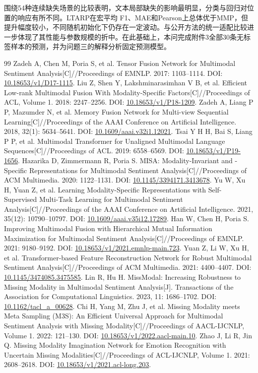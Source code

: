 \documentclass[UTF8,a4paper,11pt]{ctexart}
\newcommand{\QTwoParagraph}{\par\noindent\hspace*{2em}}
\newcounter{q2algorithm}
\begin{document}
\QTwoParagraph 围绕54种连续缺失场景的比较表明，文本局部缺失的影响最明显，分类与回归对位置的响应有所不同。LTARP在宏平均 F1、MAE和Pearson上总体优于MMP，但提升幅度较小，不同随机初始化下仍存在一定波动。与公开方法的统一适配比较进一步体现了其性能与参数规模的折中。在此基础上，本问完成附件3全部30条无标签样本的预测，并为问题三的解释分析固定预测模型。

\clearpage
{\small
\begin{thebibliography}{99}
 Zadeh A, Chen M, Poria S, et al. Tensor Fusion Network for Multimodal Sentiment Analysis[C]//Proceedings of EMNLP. 2017: 1103--1114. DOI: \url{10.18653/v1/D17-1115}.
 Liu Z, Shen Y, Lakshminarasimhan V B, et al. Efficient Low-rank Multimodal Fusion With Modality-Specific Factors[C]//Proceedings of ACL, Volume 1. 2018: 2247--2256. DOI: \url{10.18653/v1/P18-1209}.
 Zadeh A, Liang P P, Mazumder N, et al. Memory Fusion Network for Multi-view Sequential Learning[C]//Proceedings of the AAAI Conference on Artificial Intelligence. 2018, 32(1): 5634--5641. DOI: \url{10.1609/aaai.v32i1.12021}.
 Tsai Y H H, Bai S, Liang P P, et al. Multimodal Transformer for Unaligned Multimodal Language Sequences[C]//Proceedings of ACL. 2019: 6558--6569. DOI: \url{10.18653/v1/P19-1656}.
 Hazarika D, Zimmermann R, Poria S. MISA: Modality-Invariant and -Specific Representations for Multimodal Sentiment Analysis[C]//Proceedings of ACM Multimedia. 2020: 1122--1131. DOI: \url{10.1145/3394171.3413678}.
 Yu W, Xu H, Yuan Z, et al. Learning Modality-Specific Representations with Self-Supervised Multi-Task Learning for Multimodal Sentiment Analysis[C]//Proceedings of the AAAI Conference on Artificial Intelligence. 2021, 35(12): 10790--10797. DOI: \url{10.1609/aaai.v35i12.17289}.
 Han W, Chen H, Poria S. Improving Multimodal Fusion with Hierarchical Mutual Information Maximization for Multimodal Sentiment Analysis[C]//Proceedings of EMNLP. 2021: 9180--9192. DOI: \url{10.18653/v1/2021.emnlp-main.723}.
 Yuan Z, Li W, Xu H, et al. Transformer-based Feature Reconstruction Network for Robust Multimodal Sentiment Analysis[C]//Proceedings of ACM Multimedia. 2021: 4400--4407. DOI: \url{10.1145/3474085.3475585}.
 Lin R, Hu H. MissModal: Increasing Robustness to Missing Modality in Multimodal Sentiment Analysis[J]. Transactions of the Association for Computational Linguistics. 2023, 11: 1686--1702. DOI: \url{10.1162/tacl_a_00628}.
 Chi H, Yang M, Zhu J, et al. Missing Modality meets Meta Sampling (M3S): An Efficient Universal Approach for Multimodal Sentiment Analysis with Missing Modality[C]//Proceedings of AACL-IJCNLP, Volume 1. 2022: 121--130. DOI: \url{10.18653/v1/2022.aacl-main.10}.
 Zhao J, Li R, Jin Q. Missing Modality Imagination Network for Emotion Recognition with Uncertain Missing Modalities[C]//Proceedings of ACL-IJCNLP, Volume 1. 2021: 2608--2618. DOI: \url{10.18653/v1/2021.acl-long.203}.
\end{thebibliography}
}
\end{document}
